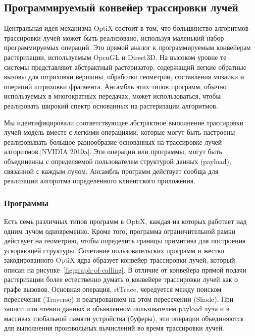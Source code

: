 \subsection{Программируемый конвейер трассировки лучей}
Центральная идея механизма OptiX состоит в том, что большинство алгоритмов трассировки лучей может быть реализовано, используя маленький набор программируемых операций. 
Это прямой аналог к программируемым конвейерам растеризации, используемым OpenGL и Direct3D. 
На высоком уровне те системы представляют абстрактный растеризатор, содержащий легкие обратные вызовы для штриховки вершины, обработки геометрии, составления мозаики и операций штриховки фрагмента. 
Ансамбль этих типов программ, обычно используемых в многократных передачах, может использоваться, чтобы реализовать широкий спектр основанных на растеризации алгоритмов. 
 
Мы идентифицировали соответствующее абстрактное выполнение трассировки лучей модель вместе с легкими операциями, которые могут быть настроены реализовывать большое разнообразие основанных на трассировке лучей алгоритмов.[NVIDIA 2010a]. 
Эти операции или программы, могут быть объединенны с определяемой пользователем структурой данных (payload), связанной с каждым лучом. 
Ансамбль программ действует сообща для реализации алгоритма определенного клиентского приложения.

\subsubsection{Программы}
Есть семь различных типов программ в OptiX, каждая из которых работает над одним лучом одновременно.
Кроме того, программа ограничительной рамки действует на геометрию, чтобы определить границы примитива для построения ускоряющей структуры.
Сочетание пользовательских программ и жестко закодированного OptiX ядра образует конвейер трассировки лучей, который описан на рисунке~\ref{fig:graph-of-calling}. 
В отличие от конвейера прямой подачи растеризации более естественно думать о конвейере трассировки лучей как о графе вызовов.
Основная операция, rtTrace, чередуется между поиском пересечения (Traverse) и реагированием на этом пересечении (Shade).
При записи или чтении данных в объявленном пользователем payload луча и в массивах глобальной памяти устройства (буферы), эти операции объединяются для выполнения произвольных вычислений во время трассировки лучей.

